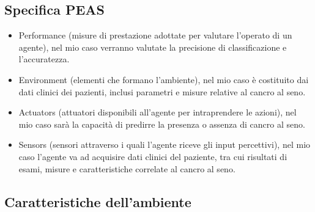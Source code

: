 \documentclass{article}
\begin{document}
\subsection{Specifica PEAS}
\begin{itemize}
    \item Performance (misure di prestazione adottate per valutare l’operato di un agente), nel mio caso
    verranno valutate la precisione di classificazione e l’accuratezza.
    \item Environment (elementi che formano l’ambiente), nel mio caso è costituito dai dati clinici dei pazienti, inclusi parametri e misure relative al cancro al seno.
    \item Actuators (attuatori disponibili all’agente per intraprendere le azioni), nel mio caso sarà la capacità di predirre la presenza o assenza di cancro al seno.
    \item Sensors (sensori attraverso i quali l’agente riceve gli input percettivi), nel mio caso l’agente va ad acquisire dati clinici del paziente, tra cui risultati di esami, misure e caratteristiche correlate al cancro al seno.
\end{itemize}

\subsection{Caratteristiche dell'ambiente}
\end{document}
